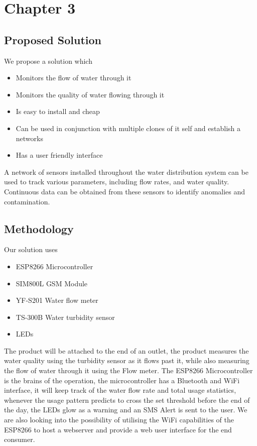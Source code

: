 \chapter{Chapter 3}
\graphicspath{{Chapter3/}}

\section{Proposed Solution}
We propose a solution which
\begin{itemize}
	\item Monitors the flow of water through it
	\item Monitors the quality of water flowing through it
	\item Is easy to install and cheap
	\item Can be used in conjunction with multiple clones of it self and establish a networks
	\item Has a user friendly interface
\end{itemize}
A network of sensors installed throughout the water distribution system can be used to track various parameters, including flow rates, and water quality. Continuous data can be obtained from these sensors to identify anomalies and contamination.
\section{Methodology}
Our solution uses 
\begin{itemize}
	\item ESP8266 Microcontroller
	\item SIM800L GSM Module
	\item YF-S201 Water flow meter
	\item TS-300B Water turbidity sensor
	\item LEDs
\end{itemize}
The product will be attached to the end of an outlet, the product measures the water quality using the turbidity sensor as it flows past it, while also measuring the flow of water through it using the Flow meter. The ESP8266 Microcontroller is the brains of the operation, the microcontroller has a Bluetooth and WiFi interface, it will keep track of the water flow rate and total usage statistics, whenever the usage pattern predicts to cross the set threshold before the end of the day, the LEDs glow as a warning and an SMS Alert is sent to the user. We are also looking into the possibility of utilising the WiFi capabilities of the ESP8266 to host a webserver and provide a web user interface for the end consumer. \\


